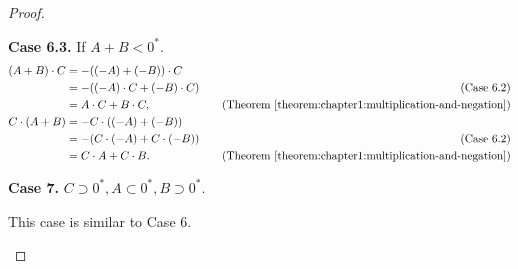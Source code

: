 \begin{proof}
\begin{enumerate}[label={(F\arabic*)}, start=5]
              \textbf{Case 6.3.} If $A + B < {0}^{*}$.
                  {\allowdisplaybreaks{}
                      \begin{align*}
                          (A + B)\cdot C & = -((-A) + (-B))\cdot C                                                                                   \\
                                         & = -((-A)\cdot C + (-B)\cdot C) & \quad\text{(Case 6.2)}                                                   \\
                                         & = A\cdot C + B\cdot C,         & \quad\text{(Theorem~\ref{theorem:chapter1:multiplication-and-negation})} \\
                          C\cdot (A + B) & = -C\cdot ((-A) + (-B))                                                                                   \\
                                         & = -(C\cdot (-A) + C\cdot (-B)) & \quad\text{(Case 6.2)}                                                   \\
                                         & = C\cdot A + C\cdot B.         & \quad\text{(Theorem~\ref{theorem:chapter1:multiplication-and-negation})}
                      \end{align*}}

              \textbf{Case 7.} $C\supset {0}^{*}, A\subset {0}^{*}, B\supset {0}^{*}$.

              This case is similar to Case 6.


\end{enumerate}
\end{proof}
